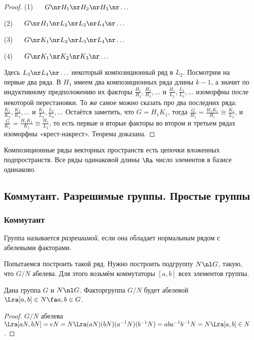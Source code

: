 \documentclass[a4paper]{article}
\begin{document}
\begin{proof}
(1) ~~ $G \nr H_1 \nr H_2 \nr H_3 \nr \ldots$

(2) ~~ $G \nr H_1 \nr L_2 \nr L_3 \nr L_4 \nr \ldots$

(3) ~~ $G \nr K_1 \nr L_2 \nr L_3 \nr L_4 \nr \ldots$

(4) ~~ $G \nr K_1 \nr K_2 \nr K_3 \nr \ldots$

Здесь $L_3 \nr L_4 \nr \ldots$ некоторый композиционный ряд в $L_2$. Посмотрим на первые два ряда.  В
$H_1$ имеем два композиционных ряда длины $k-1$, а значит по индуктивному предположению их факторы
$\frac{H_1}{H_2}, \frac{H_2}{H_3}, \ldots$ и $\frac{H_1}{L_2}, \frac{L_2}{L_3}, \ldots$ изоморфны после
некоторой перестановки. То же самое можно сказать про два последних ряда: $\frac{K_1}{K_2}, \frac{K_2}{K_3},
\ldots$ и $\frac{K_1}{L_2}, \frac{L_2}{L_3}, \ldots$ Остаётся заметить, что $G=H_1K_1$, тогда $\frac{G}{H_1}
= \frac{H_1K_1}{H_1} \cong \frac{K_1}{L_2}$, и $\frac{G}{K_1} = \frac{H_1K_1}{K_1} \cong \frac{H_1}{L_2}$, то
есть первые и вторые факторы во втором и третьем рядах изоморфны «крест-накрест». Теорема доказана.
\end{proof}

\begin{ex}
Композиционные ряды векторных пространств есть цепочки вложенных подпространств. Все ряды одинаковой  длины
$\Ra$ число элементов в базисе одинаково.
\end{ex}

\subsection{Коммутант. Разрешимые группы. Простые группы}

\subsubsection{Коммутант}

\begin{df}
Группа называется \emph{разрешимой}, если она обладает нормальным рядом с абелевыми факторами.
\end{df}

Попытаемся построить такой ряд. Нужно построить подгруппу $N \nl G$, такую, что $G/N$ абелева.  Для этого
возьмём коммутаторы $[a,b]$ всех элементов группы.

\begin{lemma}
Дана группа $G$ и $N \nl G$. Факторгруппа $G/N$ будет абелевой $\Lra [a,b] \in N \fa a, b \in G$.
\end{lemma}
\begin{proof}
$G/N$ абелева $\Lra [aN, bN] = eN = N \Lra (aN)(bN)(a^{-1}N)(b^{-1}N) = aba^{-1}b^{-1}N = N \Lra [a,b] \in N$.
\end{proof}
\end{document}
